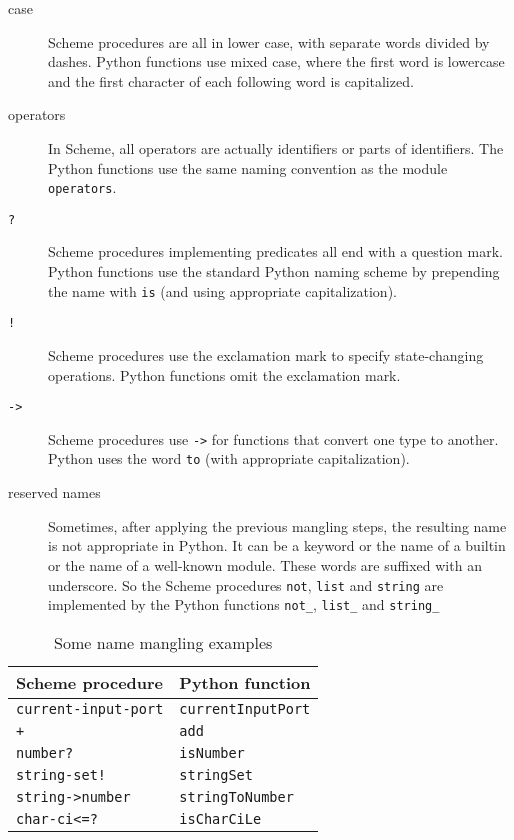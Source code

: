 \documentclass{report}
\newcommand{\code}[1]{\texttt{#1}}
\newcommand{\file}[1]{\texttt{#1}}
\begin{document}
\begin{description}

\item[case] Scheme procedures are all in lower case, with separate
words divided by dashes. Python functions use mixed case, where the
first word is lowercase and the first character of each following word
is capitalized.

\item[operators] In Scheme, all operators are actually identifiers or
parts of identifiers. The Python functions use the same naming
convention as the module \file{operators}. 

\item[\code{?}] Scheme procedures implementing predicates all end with
a question mark. Python functions use the standard Python naming
scheme by prepending the name with \code{is} (and using appropriate
capitalization).

\item[\code{!}] Scheme procedures use the exclamation mark to specify
state-changing operations. Python functions omit the exclamation mark.

\item[\code{->}] Scheme procedures use \code{->} for functions that
convert one type to another. Python uses the word \code{to} (with
appropriate capitalization).

\item[reserved names] Sometimes, after applying the previous mangling
steps, the resulting name is not appropriate in Python. It can be a
keyword or the name of a builtin or the name of a well-known
module. These words are suffixed with an underscore. So the Scheme
procedures \code{not}, \code{list} and \code{string} are implemented
by the Python functions \code{not\_}, \code{list\_} and
\code{string\_}

\end{description}

\begin{table}

\begin{center}
  \begin{tabular}{|ll|}
    \hline
    Scheme procedure                & Python function       \\
    \hline      
    \code{current-input-port}       & \code{currentInputPort}   \\
    \code{+}                        & \code{add}                \\
    \code{number?}                  & \code{isNumber}           \\
    \code{string-set!}              & \code{stringSet}          \\
    \code{string->number}           & \code{stringToNumber}     \\
    \code{char-ci<=?}               & \code{isCharCiLe}         \\
    \hline
  \end{tabular}
\end{center}

\caption{Some name mangling examples}
\label{table:mangling}
\end{table}
\end{document}
